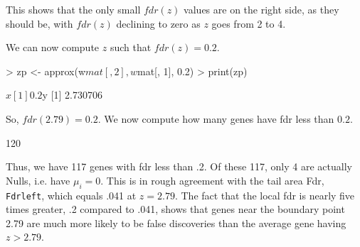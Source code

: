 \documentclass[11pt]{article}
\begin{document}
This shows that the only small $fdr(z)$ values are on the right side, as
they should be, with $fdr(z)$ declining to zero as $z$ goes from 2 to
4. 

We can now compute $z$ such that $fdr(z)=0.2$.

\begin{Schunk}
\begin{Sinput}
> zp <- approx(w$mat[, 2], w$mat[, 1], 0.2)
> print(zp)
\end{Sinput}
\begin{Soutput}
$x
[1] 0.2

$y
[1] 2.730706
\end{Soutput}
\end{Schunk}

So, $fdr(2.79) = 0.2$. We now compute how many genes have fdr
less than $0.2$.

\begin{Schunk}
\begin{Soutput}
[1] 120
\end{Soutput}
\end{Schunk}

Thus, we have 117 genes with fdr less than .2. Of these 117, only 4
are actually Nulls, i.e. have $\mu_i=0$. This is in rough agreement
with the tail area Fdr, \texttt{Fdrleft}, which equals .041 at
$z=2.79$. The fact that the local fdr is nearly five times greater, .2
compared to .041, shows that genes near the boundary point 2.79 are
much more likely to be false discoveries than the average gene having
$z > 2.79$.
\end{document}
